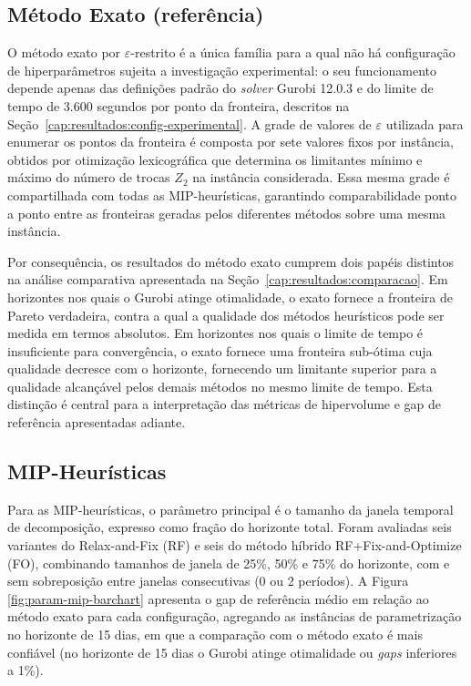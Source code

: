 \subsection{Método Exato (referência)}
\label{cap:resultados:param-exato}

O método exato por $\varepsilon$-restrito é a única família para a qual não há configuração de hiperparâmetros sujeita a investigação experimental: o seu funcionamento depende apenas das definições padrão do \textit{solver} Gurobi 12.0.3 e do limite de tempo de 3.600 segundos por ponto da fronteira, descritos na Seção~\ref{cap:resultados:config-experimental}. A grade de valores de $\varepsilon$ utilizada para enumerar os pontos da fronteira é composta por sete valores fixos por instância, obtidos por otimização lexicográfica que determina os limitantes mínimo e máximo do número de trocas $Z_2$ na instância considerada. Essa mesma grade é compartilhada com todas as MIP-heurísticas, garantindo comparabilidade ponto a ponto entre as fronteiras geradas pelos diferentes métodos sobre uma mesma instância.

Por consequência, os resultados do método exato cumprem dois papéis distintos na análise comparativa apresentada na
Seção~\ref{cap:resultados:comparacao}. Em horizontes nos quais o Gurobi atinge otimalidade, o exato fornece a fronteira de Pareto verdadeira, contra a qual a qualidade dos métodos heurísticos pode ser medida em termos absolutos. Em horizontes nos quais o limite de tempo é insuficiente para convergência, o exato fornece uma fronteira sub-ótima cuja qualidade decresce com o horizonte, fornecendo um limitante superior para a qualidade alcançável pelos demais métodos no mesmo limite de tempo. Esta distinção é central para a interpretação das métricas de hipervolume e gap de referência apresentadas adiante.

\subsection{MIP-Heurísticas}
\label{cap:resultados:param-mip}

Para as MIP-heurísticas, o parâmetro principal é o tamanho da janela temporal de decomposição, expresso como fração do horizonte total. Foram avaliadas seis variantes do Relax-and-Fix (RF) e seis do método híbrido RF+Fix-and-Optimize (FO), combinando tamanhos de janela de 25\%, 50\% e 75\% do horizonte, com e sem sobreposição entre janelas consecutivas (0 ou 2 períodos). A Figura \ref{fig:param-mip-barchart} apresenta o gap de referência médio em relação ao método exato para cada configuração, agregando as instâncias de parametrização no horizonte de 15 dias, em que a comparação com o método exato é mais confiável (no horizonte de 15 dias o Gurobi atinge otimalidade ou \textit{gaps} inferiores a 1\%).

